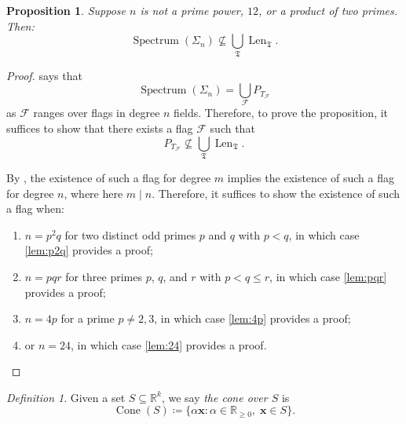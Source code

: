\documentclass[letterpaper,10pt]{amsart}
\DeclareMathOperator{\Len}{Len}
\DeclareMathOperator{\Spe}{Spectrum}
\DeclareMathOperator{\Cone}{Cone}
\newcommand{\RR}{\mathbb{R}}      %
\newcommand{\mfT}{\mathfrak{T}}
\newcommand{\cF}{\mathcal{F}}
\newtheorem{proposition}[theorem]{Proposition}
\theoremstyle{definition}
\theoremstyle{remark}
\newtheorem{definition}[theorem]{Definition}
\begin{document}
\begin{proposition}
\label{prop:counterexamples}
Suppose $n$ is not a prime power, $12$, or a product of two primes. Then:
\[
    \Spe(\Sigma_n) \not \subseteq \bigcup_{\mfT} \Len_{\mfT}.
\]
\end{proposition}
\begin{proof}
 says that
\[
    \Spe(\Sigma_n) = \bigcup_{\cF} P_{T_{\cF}}
\]
as $\cF$ ranges over flags in degree $n$ fields. Therefore, to prove the proposition, it suffices to show that there exists a flag $\cF$ such that 
\begin{equation}
\label{eqn:big-ptf}
P_{T_{\cF}} \not \subseteq \bigcup_{\mfT} \Len_{\mfT}.
\end{equation}

By , the existence of such a flag for degree $m$ implies the existence of such a flag for degree $n$, where here $m \mid n$. Therefore, it suffices to show the existence of such a flag when:
\begin{enumerate}
\item $n = p^2q$ for two distinct odd primes $p$ and $q$ with $p < q$, in which case \cref{lem:p2q} provides a proof;
\item $n = pqr$ for three primes $p$, $q$, and $r$ with $p < q \leq r$, in which case \cref{lem:pqr} provides a proof;
\item $n = 4p$ for a prime $p \neq 2,3$, in which case \cref{lem:4p} provides a proof;
\item or $n = 24$, in which case \cref{lem:24} provides a proof.
\end{enumerate}
\end{proof}

\begin{definition}
\label{def:cone}
Given a set $S \subseteq \RR^k$,  we say \emph{the cone over $S$} is 
\[
    \Cone(S) \coloneqq \{\alpha \mathbf{x} : \alpha \in \RR_{\geq 0}, \; \mathbf{x} \in S\}.
\]
\end{definition}
\end{document}
